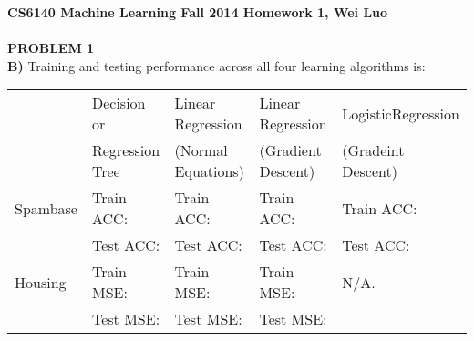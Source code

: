 \documentclass[11pt,a4paper,fleqn]{article}
\begin{document}
\textbf{CS6140 Machine Learning Fall 2014 Homework 1, Wei Luo }\\
\\
\textbf{PROBLEM 1}\\
 \textbf{B)} Training and testing performance across all four learning algorithms is: \\
 
 \hskip-2cm
 \begin{tabular}{|l|l|l|l|l|}
\hline
 &Decision or &Linear Regression &Linear Regression&LogisticRegression\\
 &Regression Tree&(Normal Equations)&(Gradient Descent)&(Gradeint Descent)\\
\hline
Spambase&Train ACC:&Train ACC:&Train ACC:&Train ACC:\\
&Test ACC:&Test ACC:&Test ACC:&Test ACC:\\
\hline
Housing&Train MSE:&Train MSE:&Train MSE:&N/A.\\
 &Test MSE:&Test MSE:&Test MSE:&\\
\hline
\end{tabular}\\
\end{document}
